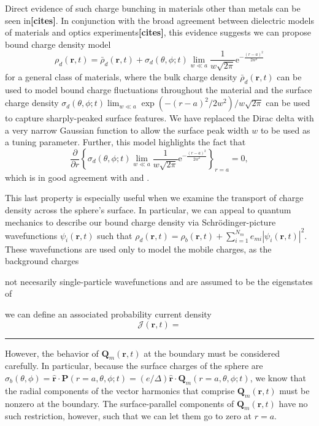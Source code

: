\documentclass{article}
\begin{document}
Direct evidence of such charge bunching in materials other than metals can be seen in\textbf{[cites]}. In conjunction with the broad agreement between dielectric models of materials and optics experiments\textbf{[cites]}, this evidence suggests we can propose bound charge density model
\begin{equation}
\rho_d(\mathbf{r},t) = \bar{\rho}_d(\mathbf{r},t) + \sigma_d(\theta,\phi;t)\lim_{w\ll a}\frac{1}{w\sqrt{2\pi}}\mathrm{e}^{-\frac{(r - a)^2}{2w^2}}
\end{equation}
for a general class of materials, where the bulk charge density $\bar{\rho}_d(\mathbf{r},t)$ can be used to model bound charge fluctuations throughout the material and the surface charge density $\sigma_d(\theta,\phi;t)\lim_{w\ll a}\exp(-(r - a)^2/2w^2)/w\sqrt{2\pi}$ can be used to capture sharply-peaked surface features. We have replaced the Dirac delta with a very narrow Gaussian function to allow the surface peak width $w$ to be used as a tuning parameter. Further, this model highlights the fact that 
\begin{equation}
\frac{\partial}{\partial r}\left\{\sigma_d(\theta,\phi;t)\lim_{w\ll a}\frac{1}{w\sqrt{2\pi}}\mathrm{e}^{-\frac{(r - a)^2}{2w^2}}\right\}_{r = a} = 0,
\end{equation}
which is in good agreement with \citet{liebsch1987dynamical} and \citet{ishida2002static}.

This last property is especially useful when we examine the transport of charge density across the sphere's surface. In particular, we can appeal to quantum mechanics to describe our bound charge density via Schr\"{o}dinger-picture wavefunctions $\psi_i(\mathbf{r},t)$ such that $\rho_d(\mathbf{r},t) = \rho_b(\mathbf{r},t) + \sum_{i = 1}^{N_m}e_{mi}|\psi_i(\mathbf{r},t)|^2$. These wavefunctions are used only to model the mobile charges, as the background charges

 not necesarily single-particle wavefunctions and are assumed to be the eigenstates of 

 we can define an associated probability current density
\begin{equation}
\bm{\mathcal{J}}(\mathbf{r},t) = 
\end{equation}






\noindent\rule{\textwidth}{0.5pt}

However, the behavior of $\mathbf{Q}_m(\mathbf{r},t)$ at the boundary must be considered carefully. In particular, because the surface charges of the sphere are $\sigma_b(\theta,\phi) = \hat{\mathbf{r}}\cdot\mathbf{P}(r=a,\theta,\phi;t) = (e/\Delta)\hat{\mathbf{r}}\cdot\mathbf{Q}_m(r=a,\theta,\phi;t)$, we know that the radial components of the vector harmonics that comprise $\mathbf{Q}_m(\mathbf{r},t)$ must be nonzero at the boundary. The surface-parallel components of $\mathbf{Q}_m(\mathbf{r},t)$ have no such restriction, however, such that we can let them go to zero at $r = a$.
\end{document}
